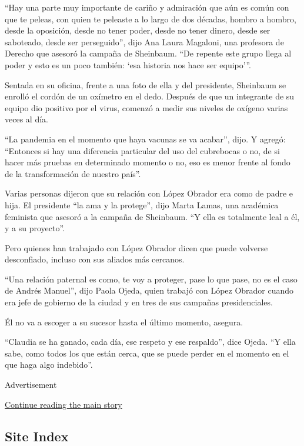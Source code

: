 ``Hay una parte muy importante de cariño y admiración que aún es común
con que te peleas, con quien te peleaste a lo largo de dos décadas,
hombro a hombro, desde la oposición, desde no tener poder, desde no
tener dinero, desde ser saboteado, desde ser perseguido'', dijo Ana
Laura Magaloni, una profesora de Derecho que asesoró la campaña de
Sheinbaum. ``De repente este grupo llega al poder y esto es un poco
también: `esa historia nos hace ser equipo'''.

Sentada en su oficina, frente a una foto de ella y del presidente,
Sheinbaum se enrolló el cordón de un oxímetro en el dedo. Después de que
un integrante de su equipo dio positivo por el virus, comenzó a medir
sus niveles de oxígeno varias veces al día.

``La pandemia en el momento que haya vacunas se va acabar'', dijo. Y
agregó: ``Entonces si hay una diferencia particular del uso del
cubrebocas o no, de si hacer más pruebas en determinado momento o no,
eso es menor frente al fondo de la transformación de nuestro país''.

Varias personas dijeron que su relación con López Obrador era como de
padre e hija. El presidente ``la ama y la protege'', dijo Marta Lamas,
una académica feminista que asesoró a la campaña de Sheinbaum. ``Y ella
es totalmente leal a él, y a su proyecto''.

Pero quienes han trabajado con López Obrador dicen que puede volverse
desconfiado, incluso con sus aliados más cercanos.

``Una relación paternal es como, te voy a proteger, pase lo que pase, no
es el caso de Andrés Manuel'', dijo Paola Ojeda, quien trabajó con López
Obrador cuando era jefe de gobierno de la ciudad y en tres de sus
campañas presidenciales.

Él no va a escoger a su sucesor hasta el último momento, asegura.

``Claudia se ha ganado, cada día, ese respeto y ese respaldo'', dice
Ojeda. ``Y ella sabe, como todos los que están cerca, que se puede
perder en el momento en el que haga algo indebido''.

Advertisement

\protect\hyperlink{after-bottom}{Continue reading the main story}

\hypertarget{site-index}{%
\subsection{Site Index}\label{site-index}}

